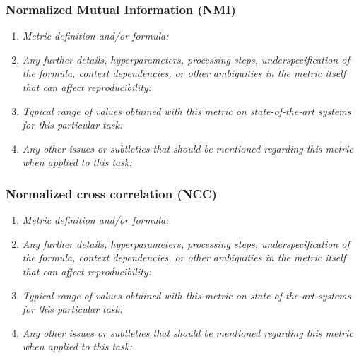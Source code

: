 \documentclass[a4paper,11pt]{article}
\begin{document}
        \subsubsection{Normalized Mutual Information (NMI)}
            \begin{enumerate}[label=\alph*.]
                \item \textit{Metric definition and/or formula:}
                \bigskip
                \item \textit{Any further details, hyperparameters, processing steps, underspecification of the formula, context dependencies, or other ambiguities in the metric itself that can affect reproducibility:}
                \bigskip
                \item \textit{Typical range of values obtained with this metric on state-of-the-art systems for this particular task:}
                \bigskip
                \item \textit{Any other issues or subtleties that should be mentioned regarding this metric when applied to this task:}
                \bigskip
            \end{enumerate}
        \subsubsection{Normalized cross correlation (NCC)}
            \begin{enumerate}[label=\alph*.]
                \item \textit{Metric definition and/or formula:}
                \bigskip
                \item \textit{Any further details, hyperparameters, processing steps, underspecification of the formula, context dependencies, or other ambiguities in the metric itself that can affect reproducibility:}
                \bigskip
                \item \textit{Typical range of values obtained with this metric on state-of-the-art systems for this particular task:}
                \bigskip
                \item \textit{Any other issues or subtleties that should be mentioned regarding this metric when applied to this task:}
                \bigskip
            \end{enumerate}
\end{document}
